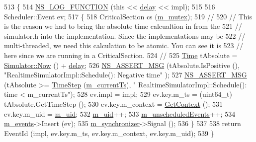 \begin{DoxyCode}
513 \{
514   \hyperlink{log-macros-disabled_8h_a90b90d5bad1f39cb1b64923ea94c0761}{NS\_LOG\_FUNCTION} (\textcolor{keyword}{this} << \hyperlink{lte_2model_2fading-traces_2fading__trace__generator_8m_a7964e6aa8f61a9d28973c8267a606ad8}{delay} << impl);
515 
516   Scheduler::Event ev;
517   \{
518     CriticalSection cs (\hyperlink{classns3_1_1RealtimeSimulatorImpl_a02be368e7cbd8a6f9d62db36c3fd373b}{m\_mutex});
519     \textcolor{comment}{//}
520     \textcolor{comment}{// This is the reason we had to bring the absolute time calcualtion in from the}
521     \textcolor{comment}{// simulator.h into the implementation.  Since the implementations may be }
522     \textcolor{comment}{// multi-threaded, we need this calculation to be atomic.  You can see it is}
523     \textcolor{comment}{// here since we are running in a CriticalSection.}
524     \textcolor{comment}{//}
525     \hyperlink{namespacens3_1_1TracedValueCallback_a7ffd3e7c142ffe7c8a1d2db9b8de38ec}{Time} tAbsolute = \hyperlink{classns3_1_1Simulator_ac3178fa975b419f7875e7105be122800}{Simulator::Now} () + \hyperlink{lte_2model_2fading-traces_2fading__trace__generator_8m_a7964e6aa8f61a9d28973c8267a606ad8}{delay};
526     \hyperlink{assert_8h_aff5ece9066c74e681e74999856f08539}{NS\_ASSERT\_MSG} (tAbsolute.IsPositive (), \textcolor{stringliteral}{"RealtimeSimulatorImpl::Schedule(): Negative time"}
      );
527     \hyperlink{assert_8h_aff5ece9066c74e681e74999856f08539}{NS\_ASSERT\_MSG} (tAbsolute >= \hyperlink{group__time_ga464a3c1cbb458c6c3ed3bd5ce9506758}{TimeStep} (\hyperlink{classns3_1_1RealtimeSimulatorImpl_a613ff41dee1e66129c4d5cc81c00cf60}{m\_currentTs}), \textcolor{stringliteral}{"
      RealtimeSimulatorImpl::Schedule(): time < m\_currentTs"});
528     ev.impl = impl;
529     ev.key.m\_ts = (uint64\_t) tAbsolute.GetTimeStep ();
530     ev.key.m\_context = \hyperlink{classns3_1_1RealtimeSimulatorImpl_a5c636fbd1266e28b69cf5f7896f72c9f}{GetContext} ();
531     ev.key.m\_uid = \hyperlink{classns3_1_1RealtimeSimulatorImpl_a733827168b695086e183a53f5a0dacf2}{m\_uid};
532     \hyperlink{classns3_1_1RealtimeSimulatorImpl_a733827168b695086e183a53f5a0dacf2}{m\_uid}++;
533     \hyperlink{classns3_1_1RealtimeSimulatorImpl_a1ef7b74c3be3d3febb1f07f8db44fb76}{m\_unscheduledEvents}++;
534     \hyperlink{classns3_1_1RealtimeSimulatorImpl_a0cccd690eafca8285f5cc4d3909a9593}{m\_events}->Insert (ev);
535     \hyperlink{classns3_1_1RealtimeSimulatorImpl_a87a72268b521afcae7ea4c891c398d27}{m\_synchronizer}->Signal ();
536   \}
537 
538   \textcolor{keywordflow}{return} EventId (impl, ev.key.m\_ts, ev.key.m\_context, ev.key.m\_uid);
539 \}
\end{DoxyCode}


